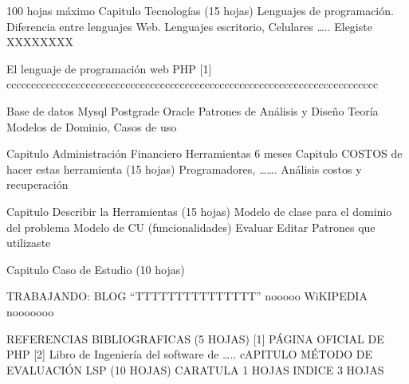100 hojas máximo
Capitulo Tecnologías (15 hojas)
Lenguajes de programación.
Diferencia entre lenguajes Web. Lenguajes escritorio, Celulares …..
Elegiste XXXXXXXX

El lenguaje de programación web PHP [1] ccccccccccccccccccccccccccccccccccccccccccccccccccccccccccccccccccccccccccc

Base de datos
	Mysql
	Postgrade
	Oracle
Patrones de Análisis y Diseño Teoría
Modelos de Dominio, Casos de uso

Capitulo  Administración Financiero
Herramientas 6 meses
Capitulo COSTOS de hacer estas herramienta  (15 hojas)
Programadores, …….
Análisis costos y recuperación


Capitulo Describir la Herramientas (15 hojas)
Modelo de clase para el dominio del problema
Modelo de CU (funcionalidades)
	Evaluar
Editar
Patrones que utilizaste

Capitulo Caso de Estudio (10 hojas)

TRABAJANDO:
BLOG “TTTTTTTTTTTTTTT”   nooooo
WiKIPEDIA   nooooooo

REFERENCIAS BIBLIOGRAFICAS (5 HOJAS)
[1] PÁGINA OFICIAL DE PHP    
[2] Libro de Ingeniería del software de …..
cAPITULO MÉTODO DE EVALUACIÓN
LSP
(10 HOJAS)
CARATULA 1 HOJAS
INDICE 3 HOJAS